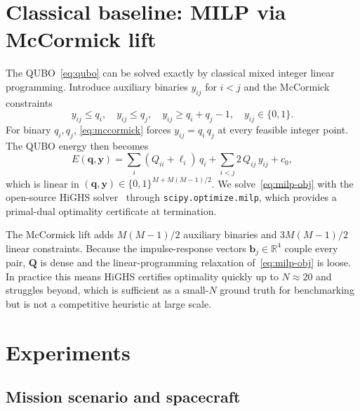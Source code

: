 \documentclass[11pt,a4paper]{article}
\theoremstyle{plain}
\newcommand{\R}{\mathbb{R}}
\newcommand{\bvec}[1]{\bm{#1}}
\newcommand{\qvec}{\bvec{q}}
\newcommand{\bbvec}{\bvec{b}}
\newcommand{\Qmat}{\bvec{Q}}
\begin{document}
\section{Classical baseline: MILP via McCormick lift}\label{sec:milp}

The QUBO~\eqref{eq:qubo} can be solved exactly by classical mixed
integer linear programming. Introduce auxiliary binaries
$y_{ij}$ for $i < j$ and the McCormick
constraints~\cite{McCormick1976}
\begin{equation}\label{eq:mccormick}
  y_{ij} \le q_i,\quad
  y_{ij} \le q_j,\quad
  y_{ij} \ge q_i + q_j - 1,\quad
  y_{ij} \in \{0,1\}.
\end{equation}
For binary $q_i, q_j$, \eqref{eq:mccormick} forces
$y_{ij} = q_i\,q_j$ at every feasible integer point. The QUBO
energy then becomes
\begin{equation}\label{eq:milp-obj}
  E(\qvec, \bvec{y})
  = \sum_i (Q_{ii} + \ell_i)\, q_i
  + \sum_{i<j} 2\,Q_{ij}\, y_{ij} + c_0,
\end{equation}
which is linear in $(\qvec, \bvec{y}) \in \{0,1\}^{M + M(M-1)/2}$.
We solve~\eqref{eq:milp-obj} with the open-source HiGHS
solver~\cite{Huangfu2018} through \texttt{scipy.optimize.milp},
which provides a primal-dual optimality certificate at
termination.

The McCormick lift adds $M(M-1)/2$ auxiliary binaries and $3
M(M-1)/2$ linear constraints. Because the impulse-response
vectors $\bbvec_j \in \R^4$ couple every pair, $\Qmat$ is dense
and the linear-programming relaxation of~\eqref{eq:milp-obj} is
loose. In practice this means HiGHS certifies optimality
quickly up to $N \approx 20$ and struggles beyond, which is
sufficient as a small-$N$ ground truth for benchmarking but is
not a competitive heuristic at large scale.

\section{Experiments}\label{sec:results}

\subsection{Mission scenario and spacecraft}\label{sec:scenario}
\end{document}
